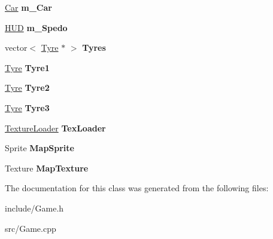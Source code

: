 \begin{DoxyCompactItemize}
\item 
\hypertarget{class_game_ac542da39deb8370524eb7573a3dac252}{}\hyperlink{class_car}{Car} {\bfseries m\+\_\+\+Car}\label{class_game_ac542da39deb8370524eb7573a3dac252}

\item 
\hypertarget{class_game_a848d449a2e906074d4a28668ad36bdc5}{}\hyperlink{class_h_u_d}{H\+U\+D} {\bfseries m\+\_\+\+Spedo}\label{class_game_a848d449a2e906074d4a28668ad36bdc5}

\item 
\hypertarget{class_game_aec9e5578d881abadc24ecc8fb2f8ac30}{}vector$<$ \hyperlink{class_tyre}{Tyre} $\ast$ $>$ {\bfseries Tyres}\label{class_game_aec9e5578d881abadc24ecc8fb2f8ac30}

\item 
\hypertarget{class_game_ad2262bead63e8b67b3e25833ec6622ab}{}\hyperlink{class_tyre}{Tyre} {\bfseries Tyre1}\label{class_game_ad2262bead63e8b67b3e25833ec6622ab}

\item 
\hypertarget{class_game_a4e563d446466f08bd0ec0efc5dddf910}{}\hyperlink{class_tyre}{Tyre} {\bfseries Tyre2}\label{class_game_a4e563d446466f08bd0ec0efc5dddf910}

\item 
\hypertarget{class_game_a0cddbe8d2a7eedffaee89b489347942f}{}\hyperlink{class_tyre}{Tyre} {\bfseries Tyre3}\label{class_game_a0cddbe8d2a7eedffaee89b489347942f}

\item 
\hypertarget{class_game_a6d7faee481b4a3b40a5b0765643c0870}{}\hyperlink{class_texture_loader}{Texture\+Loader} {\bfseries Tex\+Loader}\label{class_game_a6d7faee481b4a3b40a5b0765643c0870}

\item 
\hypertarget{class_game_a34d3fe9d5ddcb15c3408b212275fe92e}{}Sprite {\bfseries Map\+Sprite}\label{class_game_a34d3fe9d5ddcb15c3408b212275fe92e}

\item 
\hypertarget{class_game_a3d775b7a861bd47dc7b96310ae8cc798}{}Texture {\bfseries Map\+Texture}\label{class_game_a3d775b7a861bd47dc7b96310ae8cc798}

\end{DoxyCompactItemize}


The documentation for this class was generated from the following files\+:\begin{DoxyCompactItemize}
\item 
include/Game.\+h\item 
src/Game.\+cpp\end{DoxyCompactItemize}
